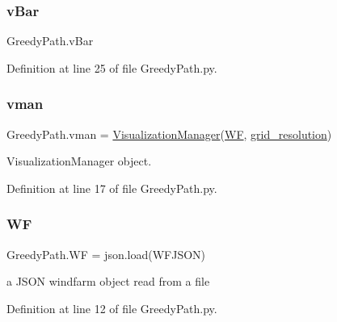\mbox{\label{namespace_greedy_path_a03451064d5350073da9cb253f7684576}} 
\subsubsection{\texorpdfstring{v\+Bar}{vBar}}
{\footnotesize\ttfamily Greedy\+Path.\+v\+Bar}



Definition at line 25 of file Greedy\+Path.\+py.

\mbox{\label{namespace_greedy_path_a0b686e13d9e46e185e611dc0b5d92e8f}} 
\subsubsection{\texorpdfstring{vman}{vman}}
{\footnotesize\ttfamily Greedy\+Path.\+vman = \mbox{\hyperlink{classvisualization__manager___d_j_1_1_visualization_manager}{Visualization\+Manager}}(\mbox{\hyperlink{namespace_greedy_path_a23138d42757308a7b4324002f60d751a}{WF}}, \mbox{\hyperlink{namespace_greedy_path_a1d2a41e131ea92ec827544055660645d}{grid\+\_\+resolution}})}



Visualization\+Manager object. 



Definition at line 17 of file Greedy\+Path.\+py.

\mbox{\label{namespace_greedy_path_a23138d42757308a7b4324002f60d751a}} 
\subsubsection{\texorpdfstring{WF}{WF}}
{\footnotesize\ttfamily Greedy\+Path.\+WF = json.\+load(W\+F\+J\+S\+ON)}



a J\+S\+ON windfarm object read from a file 



Definition at line 12 of file Greedy\+Path.\+py.

